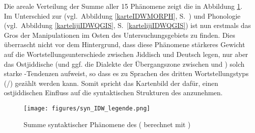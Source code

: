  

\largerpage[-1]
Die areale Verteilung der Summe aller 15 Phänomene zeigt die  in Abbildung \ref{karteIDWSYN}. Im Unterschied zur  (vgl.\, Abbildung \ref{karteIDWMORPH}, S.\, \pageref{karteIDWMORPH}) und Phonologie (vgl.\, Abbildung \ref{kartelijiIDWQGIS}, S.\, \ref{kartelijiIDWQGIS}) ist nun erstmals das Gros der Manipulationen im Osten des Untersuchungsgebiets zu finden. Dies überrascht nicht vor dem Hintergrund, dass diese Phänomene stärkeres Gewicht auf die Wortstellungsunterschiede zwischen Jiddisch und Deutsch legen, nur aber das Ostjiddische (und ggf. die Dialekte der Übergangszone zwischen \hai{{\OJ}} und \hai{{\WJ}}) solch starke \hai{{\VO}}-Tendenzen aufweist, so dass es zu Sprachen des dritten Wortstellungstyps (\hai{{\OV}}/\hai{{\VO}}) gezählt werden kann. Somit spricht das Kartenbild der  dafür, einen ostjiddischen Einfluss auf die syntaktischen Strukturen des \hai{{\LiJieins}} anzunehmen. 

\begin{figure}[b]
\centering
\texttt{[image: figures/syn\_IDW\_legende.png]}
		\caption{\label{karteIDWSYN} Summe syntaktischer Phänomene des  ( berechnet mit )}
		\end{figure}
  

